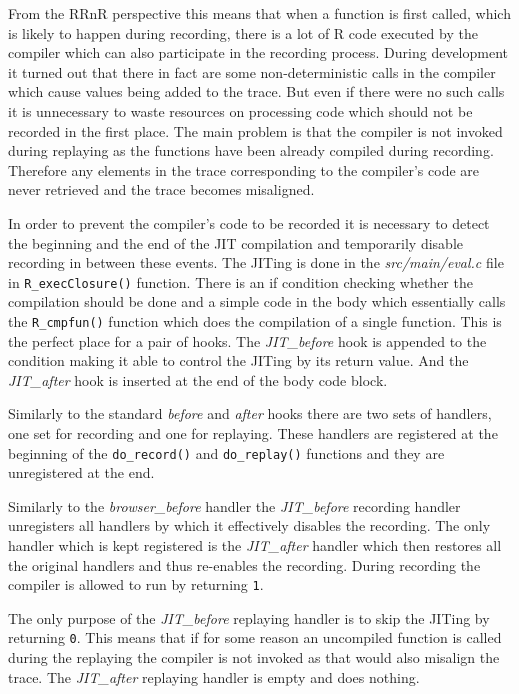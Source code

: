 \documentclass[thesis=M,english,hidelinks]{FITthesis}[2012/10/20]
\begin{document}
		From the RRnR perspective this means that when a function is first called, which is likely to happen during recording, there is a lot of R code executed by the compiler which can also participate in the recording process. During development it turned out that there in fact are some non-deterministic calls in the compiler which cause values being added to the trace. But even if there were no such calls it is unnecessary to waste resources on processing code which should not be recorded in the first place. The main problem is that the compiler is not invoked during replaying as the functions have been already compiled during recording. Therefore any elements in the trace corresponding to the compiler's code are never retrieved and the trace becomes misaligned.\par
		
		In order to prevent the compiler's code to be recorded it is necessary to detect the beginning and the end of the JIT compilation and temporarily disable recording in between these events. The JITing is done in the \emph{src/main/eval.c} file in \lstinline|R_execClosure()| function. There is an if condition checking whether the compilation should be done and a simple code in the body which essentially calls the \lstinline|R_cmpfun()| function which does the compilation of a single function. This is the perfect place for a pair of hooks. The \emph{JIT\_before} hook is appended to the condition making it able to control the JITing by its return value. And the \emph{JIT\_after} hook is inserted at the end of the body code block.\par
		
		Similarly to the standard \emph{before} and \emph{after} hooks there are two sets of handlers, one set for recording and one for replaying. These handlers are registered at the beginning of the \lstinline|do_record()| and \lstinline|do_replay()| functions and they are unregistered at the end.\par
		
		Similarly to the \emph{browser\_before} handler the \emph{JIT\_before} recording handler unregisters all handlers by which it effectively disables the recording. The only handler which is kept registered is the \emph{JIT\_after} handler which then restores all the original handlers and thus re-enables the recording. During recording the compiler is allowed to run by returning \lstinline|1|.\par
		
		The only purpose of the \emph{JIT\_before} replaying handler is to skip the JITing by returning \lstinline|0|. This means that if for some reason an uncompiled function is called during the replaying the compiler is not invoked as that would also misalign the trace. The \emph{JIT\_after} replaying handler is empty and does nothing.\par
		
\end{document}
